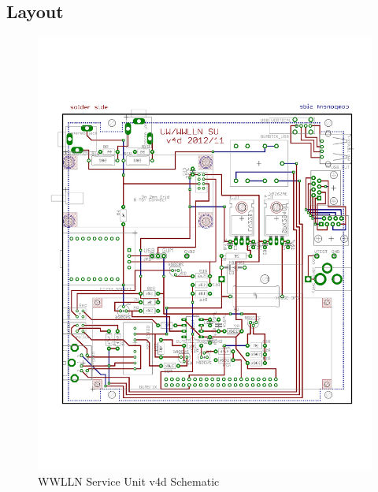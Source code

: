 \subsection{Layout}

\begin{figure}[ht!]
   \centering
   \includegraphics[scale=.75]{Appendix/Figures/wwlln_SU_v4.pdf} 
   \caption{WWLLN Service Unit v4d Schematic}
   \label{app:suBoard}
\end{figure}

